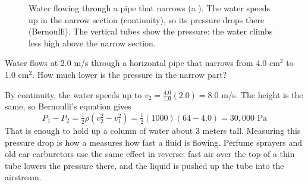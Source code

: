 \begin{figure}[H]
\centering
{}
\caption{Water flowing through a pipe that narrows (a ). The water speeds up in the
narrow section (continuity), so its pressure drops there (Bernoulli). The vertical tubes show the pressure: the
water climbs less high above the narrow section.}
\label{fig:venturi}
\end{figure}

\begin{Worked}
\begin{Problem}
Water flows at 2.0 m/s through a horizontal pipe that narrows from 4.0 cm$^2$ to 1.0 cm$^2$. How
much lower is the pressure in the narrow part?
\end{Problem}
\begin{Solution}
By continuity, the water speeds up to $v_2 = \frac{4.0}{1.0}(2.0) = 8.0$ m/s. The height is the same,
so Bernoulli's equation gives
$$P_1 - P_2 = \tfrac{1}{2}\rho\left(v_2^2 - v_1^2\right) = \tfrac{1}{2}(1000)(64 - 4.0) = 30{,}000 \text{ Pa}$$
That is enough to hold up a column of water about 3 meters tall. Measuring this pressure drop is how a
 measures how fast a fluid is flowing. Perfume sprayers and old car carburetors use the
same effect in reverse: fast air over the top of a thin tube lowers the pressure there, and the liquid is pushed up
the tube into the airstream.
\end{Solution}
\end{Worked}

